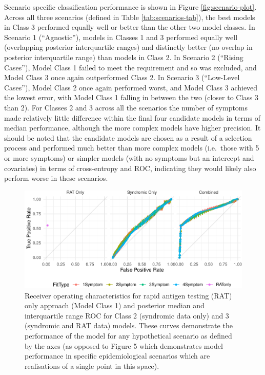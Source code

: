 \documentclass[]{elsarticle} %
\begin{document}
Scenario specific classification performance is shown in Figure \ref{fig:scenario-plot}.
Across all three scenarios (defined in Table \ref{tab:scenarios-tab}), the best models in Class 3 performed equally well or better than the other two model classes.
In Scenario 1 (``Agnostic''), models in Classes 1 and 3 performed equally well (overlapping posterior interquartile ranges) and distinctly better (no overlap in posterior interquartile range) than models in Class 2.
In Scenario 2 (``Rising Cases''), Model Class 1 failed to meet the requirement and so was excluded, and Model Class 3 once again outperformed Class 2.
In Scenario 3 (``Low-Level Cases''), Model Class 2 once again performed worst, and Model Class 3 achieved the lowest error, with Model Class 1 falling in between the two (closer to Class 3 than 2).
For Classes 2 and 3 across all the scenarios the number of symptoms made relatively little difference within the final four candidate models in terms of median performance, although the more complex models have higher precision.
It should be noted that the candidate models are chosen as a result of a selection process and performed much better than more complex models (i.e.~those with 5 or more symptoms) or simpler models (with no symptoms but an intercept and covariates) in terms of cross-entropy and ROC, indicating they would likely also perform worse in these scenarios.

\begin{figure}
\centering
\includegraphics{0501_MainText_files/figure-latex/ROC-plot-1.pdf}
\caption{\label{fig:ROC-plot}Receiver operating characteristics for rapid antigen testing (RAT) only approach (Model Class 1) and posterior median and interquartile range ROC for Class 2 (syndromic data only) and 3 (syndromic and RAT data) models. These curves demonstrate the performance of the model for any hypothetical scenario as defined by the axes (as opposed to Figure 5 which demonstrates model performance in specific epidemiological scenarios which are realisations of a single point in this space).}
\end{figure}
\end{document}
